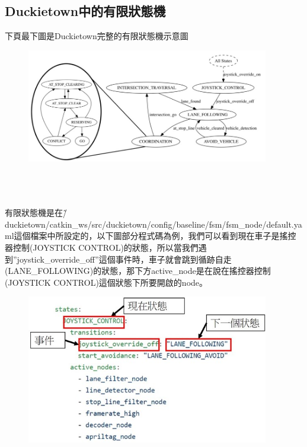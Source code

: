 \documentclass{article}
\begin{document}
\subsection{Duckietown中的有限狀態機}

下頁最下圖是Duckietown完整的有限狀態機示意圖
\\
\begin{figure}[htp]
    \begin{center}
        \includegraphics[width=300pt]{pic/圖片26.jpg}
    \end{center}
\end{figure}
\\\\\\
有限狀態機是在\~/duckietown/catkin\_ws/src/duckietown/config/baseline/fsm/fsm\_node/default.yaml這個檔案中所設定的，以下圖部分程式碼為例，我們可以看到現在車子是搖控器控制(JOYSTICK CONTROL)的狀態，所以當我們遇到”joystick\_override\_off”這個事件時，車子就會跳到循跡自走(LANE\_FOLLOWING)的狀態，那下方active\_node是在說在搖控器控制(JOYSTICK CONTROL)這個狀態下所要開啟的node。
\\

\begin{figure}[htp]
    \begin{center}
        \includegraphics[width=300pt]{pic/圖片27.jpg}
    \end{center}
\end{figure}
\end{document}
